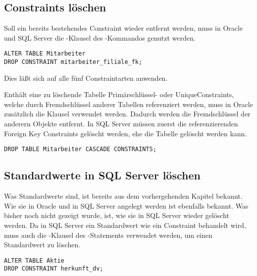 \subsection{Constraints löschen}
Soll ein bereits bestehendes Constraint wieder entfernt werden, muss in Oracle und SQL Server die -Klausel des -Kommandos genutzt werden.
\begin{lstlisting}[language=oracle_sql,caption={Ein Constraint löschen},label=sql09_21]
ALTER TABLE Mitarbeiter
DROP CONSTRAINT mitarbeiter_filiale_fk;
        \end{lstlisting}
Dies läßt sich auf alle fünf Constraintarten anwenden.

Enthält eine zu löschende Tabelle Primär\-schlüssel- oder Unique\-Constraints, welche durch Fremd\-schlüssel anderer Tabellen referenziert werden, muss in Oracle zusätzlich die Klausel  verwendet werden. Dadurch werden die Fremdschlüssel der anderern Objekte entfernt. In SQL Server müssen zuerst die referenzierenden Foreign Key Constraints gelöscht werden, ehe die Tabelle gelöscht werden kann.
\begin{lstlisting}[language=oracle_sql, caption={Eine Tabelle mit
        Fremdschlüsselbeziehungen löschen},label=sql09_22]
DROP TABLE Mitarbeiter CASCADE CONSTRAINTS;
        \end{lstlisting}
\subsection{Standardwerte in SQL Server löschen}
\label{sqlserverdefaultconstraint}
Was Standardwerte sind, ist bereits aus dem vorhergehenden Kapitel bekannt. Wie sie in Oracle und in SQL Server angelegt werden ist ebenfalls bekannt. Was bisher noch nicht gezeigt wurde, ist, wie sie in SQL Server wieder gelöscht werden. Da in SQL Server ein Standardwert wie ein Constraint behandelt wird, muss auch die -Klausel des -Statements verwendet werden, um einen Standardwert zu löschen.
\begin{lstlisting}[language=ms_sql,caption={Einen Standardwert in SQL Server löschen},label=sql09_23]
ALTER TABLE Aktie
DROP CONSTRAINT herkunft_dv;
        \end{lstlisting}
